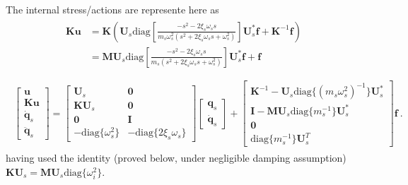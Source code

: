 \documentclass[letterpaper,10pt,english]{jupyterBook}
\begin{document}
\sphinxAtStartPar
The internal stress/actions are represente here as
\begin{equation*}
\begin{split}\begin{aligned}
 \mathbf{K} \mathbf{u} 
  & = \mathbf{K} \left( \mathbf{U}_s \text{diag}\left[ \frac{-s^2- 2 \xi_s \omega_s s}{m_s \omega_s^2 ( s^2 + 2 \xi_s \omega_s s + \omega^2_s )} \right] \mathbf{U}_s^* \mathbf{f} + \mathbf{K}^{-1} \mathbf{f} \right) \\
  & = \mathbf{M} \mathbf{U}_s \text{diag}\left[ \frac{-s^2- 2 \xi_s \omega_s s}{m_s ( s^2 + 2 \xi_s \omega_s s + \omega^2_s )} \right] \mathbf{U}_s^* \mathbf{f} + \mathbf{f}\\
\end{aligned}\end{split}
\end{equation*}
\sphinxAtStartPar
{}
\begin{equation*}
\begin{split}\begin{aligned}
  \begin{bmatrix} \mathbf{u} \\ \mathbf{K} \mathbf{u} \\ \dot{\mathbf{q}}_s \\ \ddot{\mathbf{q}}_s \end{bmatrix} 
  = \begin{bmatrix} \mathbf{U}_s & \mathbf{0} \\ \mathbf{K} \mathbf{U}_s  &  \mathbf{0} \\ \mathbf{0} & \mathbf{I} \\ -\text{diag}\{ \omega^2_s \} & -\text{diag}\{ 2 \xi_s \omega_s \}  \end{bmatrix} \begin{bmatrix} \mathbf{q}_s \\ \dot{\mathbf{q}}_s  \end{bmatrix} + \begin{bmatrix} \mathbf{K}^{-1} - \mathbf{U}_s \text{diag}\{ (m_s \omega_s^2)^{-1} \} \mathbf{U}^*_s \\ \mathbf{I} - \mathbf{M} \mathbf{U}_s \text{diag}\{ m_s^{-1} \} \mathbf{U}^*_s \\ \mathbf{0} \\ \text{diag}\{ m_s^{-1} \} \mathbf{U}_s^T \end{bmatrix} \mathbf{f} \ .
\end{aligned}\end{split}
\end{equation*}
\sphinxAtStartPar
having used the identity (proved below, under negligible damping assumption) \(\mathbf{K} \mathbf{U}_s = \mathbf{M} \mathbf{U}_s \text{diag}\{\omega_i^2\}\).
\end{document}
